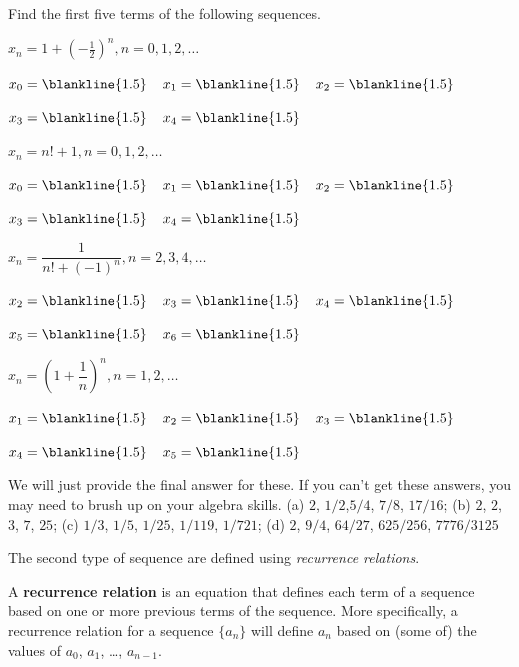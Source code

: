 \begin{exer}
Find the first five terms of the following sequences.
\begin{lenum}
  \setlength{\itemsep}{.35in}
\item 
${\displaystyle x_n = 1 + \left(-\frac{1}{2}\right)^n, n = 0, 1, 2, \ldots}$

\noindent
$x_0=\blankline{1.5}$\, \,  $x_1=\blankline{1.5}$\, \,  $x_2=\blankline{1.5}$

\noindent
$x_3=\blankline{1.5}$\, \,  $x_4=\blankline{1.5}$
\item 
${\displaystyle x_n = n! + 1, n = 0, 1, 2, \ldots}$

\noindent
$x_0=\blankline{1.5}$\, \,  $x_1=\blankline{1.5}$\, \,  $x_2=\blankline{1.5}$

\noindent
$x_3=\blankline{1.5}$\, \,  $x_4=\blankline{1.5}$ 
\item 
${\displaystyle x_n = \dfrac{1}{n! + (-1)^n}, n =  2, 3, 4,\ldots}$

\noindent
$x_2=\blankline{1.5}$\, \,  $x_3=\blankline{1.5}$\, \,  $x_4=\blankline{1.5}$

\noindent
$x_5=\blankline{1.5}$\, \,  $x_6=\blankline{1.5}$
\item
${\displaystyle x_n = \left(1 +\dfrac{1}{n}\right)^{n}, n = 1, 2,\ldots }$

\noindent
$x_1=\blankline{1.5}$\, \,  $x_2=\blankline{1.5}$\, \,  $x_3=\blankline{1.5}$

\noindent
$x_4=\blankline{1.5}$\, \,  $x_5=\blankline{1.5}$ 
\end{lenum}
\vspace*{.25in}
\begin{answer}
We will just provide the final answer for these.  If you can't get these answers, you may need to brush 
up on your algebra skills.
(a) $2$, $1/2$,$5/4$, $7/8$, $17/16$; 
(b) $2$, $2$, $3$, $7$, $25$; 
(c) $1/3$, $1/5$, $1/25$, $1/119$, $1/721$; 
(d) $2$, $9/4$, $64/27$, $625/256$, $7776/3125$
\end{answer}
\end{exer}


The second type of sequence are defined using {\em recurrence relations}.

\begin{df}
A {\bf recurrence relation} is an equation
that defines each term of a sequence based on one or more
previous terms of the sequence.
More specifically, a recurrence relation for a sequence $\{a_n\}$
will define $a_n$ based on (some of) the values of 
$a_0$, $a_1$, \ldots, $a_{n-1}$.
\end{df}

